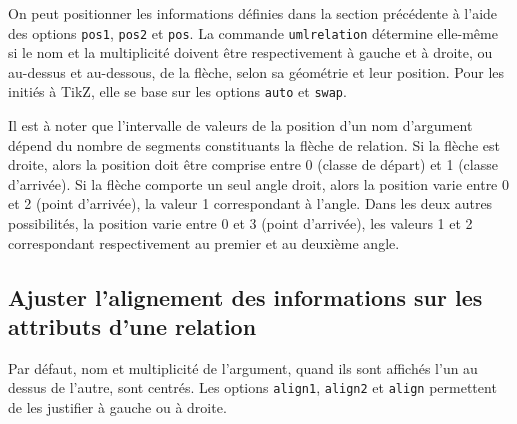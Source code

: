 \documentclass[a4paper,11pt]{report}
\newcommand{\inputTikZ}[1]{%
  }%
\newcommand{\inputTikZ}[1]{%
    \texttt{[image: fig/\#1.pdf]}%
  }%
\newcommand{\TikZ}{{\sc TikZ}}
\begin{document}
On peut positionner les informations définies dans la section précédente à l'aide des options {\tt pos1}, {\tt pos2} et {\tt pos}.
La commande {\tt umlrelation} détermine elle-même si le nom et la multiplicité doivent être respectivement à gauche et à droite, ou au-dessus et au-dessous, de la flèche, selon sa géométrie et leur position. Pour les initiés à \TikZ, elle se base sur les options {\tt auto} et {\tt swap}.

\medskip

\begin{minipage}{0.5\textwidth}

\end{minipage}
\begin{minipage}{0.4\textwidth}
\begin{center}
\inputTikZ{relationpos}
\end{center}
\end{minipage}

\medskip

Il est à noter que l'intervalle de valeurs de la position d'un nom d'argument dépend du nombre de segments constituants la flèche de relation. Si la flèche est droite, alors la position doit être comprise entre 0 (classe de départ) et 1 (classe d'arrivée). Si la flèche comporte un seul angle droit, alors la position varie entre 0 et 2 (point d'arrivée), la valeur 1 correspondant à l'angle. Dans les deux autres possibilités, la position varie entre 0 et 3 (point d'arrivée), les valeurs 1 et 2 correspondant respectivement au premier et au deuxième angle.

\subsection{Ajuster l'alignement des informations sur les attributs d'une relation}\label{ss.relalign}

Par défaut, nom et multiplicité de l'argument, quand ils sont affichés l'un au dessus de l'autre, sont centrés. Les options {\tt align1}, {\tt align2} et {\tt align} permettent de les justifier à gauche ou à droite.

\medskip

\begin{minipage}{0.5\textwidth}

\end{minipage}
\begin{minipage}{0.4\textwidth}
\begin{center}
\inputTikZ{relationalign}
\end{center}
\end{minipage}
\end{document}
